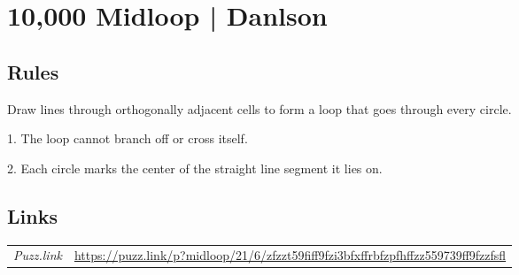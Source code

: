\section{10,000 Midloop | {\normalfont Danlson}}
\label{sec:37-10000-midloop-danlson}

\subsection*{Rules}
\begin{markdown}
Draw lines through orthogonally adjacent cells to form a loop that goes through every circle.

1. The loop cannot branch off or cross itself.

2. Each circle marks the center of the straight line segment it lies on.
\end{markdown}
\subsection*{Links}
\begin{tabularx}{\textwidth}{l X}
\emph{Puzz.link} & \url{https://puzz.link/p?midloop/21/6/zfzzt59fiff9fzi3bfxffrbfzpfhffzz559739ff9fzzfsfl} \\
\end{tabularx}
\pagebreak
